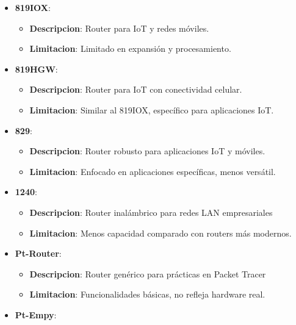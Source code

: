 \documentclass{article}
\begin{document}
\begin{enumerate}
\begin{itemize}
\begin{itemize}
                \end{itemize}
                \item\textbf{819IOX}:
                 \begin{itemize}
                    \item \textbf{Descripcion}: Router para IoT y redes móviles.
                    \item \textbf{Limitacion}:  Limitado en expansión y procesamiento.
                \end{itemize}
                \item\textbf{819HGW}:
                 \begin{itemize}
                    \item \textbf{Descripcion}: Router para IoT con conectividad celular.
                    \item \textbf{Limitacion}: Similar al 819IOX, específico para aplicaciones IoT.
                \end{itemize}
                \item\textbf{829}:
                 \begin{itemize}
                    \item \textbf{Descripcion}: Router robusto para aplicaciones IoT y móviles.
                    \item \textbf{Limitacion}: Enfocado en aplicaciones específicas, menos versátil.
                \end{itemize}
                \item\textbf{1240}:
                 \begin{itemize}
                    \item \textbf{Descripcion}: Router inalámbrico para redes LAN empresariales
                    \item \textbf{Limitacion}: Menos capacidad comparado con routers más modernos.
                \end{itemize}
                \item\textbf{Pt-Router}:
                 \begin{itemize}
                    \item \textbf{Descripcion}: Router genérico para prácticas en Packet Tracer
                    \item \textbf{Limitacion}: Funcionalidades básicas, no refleja hardware real.
                \end{itemize}
                \item\textbf{Pt-Empy}:
                 \begin{itemize}

\end{itemize}
\end{itemize}
\end{enumerate}
\end{document}
